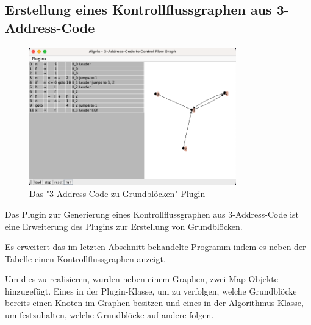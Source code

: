 \subsection{Erstellung eines Kontrollflussgraphen aus 3-Address-Code}
\begin{figure}[h]
  \centering
  \includegraphics[width=0.8\textwidth]{fig/Screenshot_TacToCFG.png}
  \caption{Das "3-Address-Code zu Grundblöcken" Plugin}
  \label{fig:TACtoCFG}
\end{figure}

Das Plugin zur Generierung eines Kontrollflussgraphen aus 3-Address-Code 
ist eine Erweiterung des Plugins zur Erstellung von Grundblöcken.

Es erweitert das im letzten Abschnitt behandelte Programm indem es
neben der Tabelle einen Kontrollflussgraphen anzeigt.

Um dies zu realisieren, wurden neben einem Graphen, zwei Map-Objekte hinzugefügt. 
Eines in der Plugin-Klasse, um zu verfolgen, welche Grundblöcke bereits einen 
Knoten im Graphen besitzen und eines in der Algorithmus-Klasse, um festzuhalten,
welche Grundblöcke auf andere folgen.

